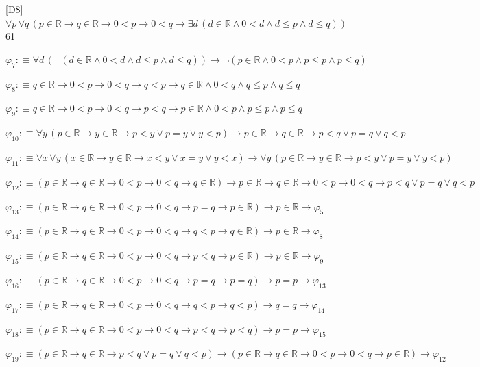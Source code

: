 \begin{fullproof}{[D8]}{$\forall p\,\forall q\,(p \in \mathbb{R} \to q \in \mathbb{R} \to 0 < p \to 0 < q \to \exists d\,(d \in \mathbb{R} \land 0 < d \land d \leq p \land d \leq q))$}{61}
\begin{abbrevlist}
\item $\varphi_{7} :\equiv \forall d\,(\neg (d \in \mathbb{R} \land 0 < d \land d \leq p \land d \leq q)) \to \neg (p \in \mathbb{R} \land 0 < p \land p \leq p \land p \leq q)$
\item $\varphi_{8} :\equiv q \in \mathbb{R} \to 0 < p \to 0 < q \to q < p \to q \in \mathbb{R} \land 0 < q \land q \leq p \land q \leq q$
\item $\varphi_{9} :\equiv q \in \mathbb{R} \to 0 < p \to 0 < q \to p < q \to p \in \mathbb{R} \land 0 < p \land p \leq p \land p \leq q$
\item $\varphi_{10} :\equiv \forall y\,(p \in \mathbb{R} \to y \in \mathbb{R} \to p < y \lor p = y \lor y < p) \to p \in \mathbb{R} \to q \in \mathbb{R} \to p < q \lor p = q \lor q < p$
\item $\varphi_{11} :\equiv \forall x\,\forall y\,(x \in \mathbb{R} \to y \in \mathbb{R} \to x < y \lor x = y \lor y < x) \to \forall y\,(p \in \mathbb{R} \to y \in \mathbb{R} \to p < y \lor p = y \lor y < p)$
\item $\varphi_{12} :\equiv (p \in \mathbb{R} \to q \in \mathbb{R} \to 0 < p \to 0 < q \to q \in \mathbb{R}) \to p \in \mathbb{R} \to q \in \mathbb{R} \to 0 < p \to 0 < q \to p < q \lor p = q \lor q < p$
\item $\varphi_{13} :\equiv (p \in \mathbb{R} \to q \in \mathbb{R} \to 0 < p \to 0 < q \to p = q \to p \in \mathbb{R}) \to p \in \mathbb{R} \to \varphi_{5}$
\item $\varphi_{14} :\equiv (p \in \mathbb{R} \to q \in \mathbb{R} \to 0 < p \to 0 < q \to q < p \to q \in \mathbb{R}) \to p \in \mathbb{R} \to \varphi_{8}$
\item $\varphi_{15} :\equiv (p \in \mathbb{R} \to q \in \mathbb{R} \to 0 < p \to 0 < q \to p < q \to p \in \mathbb{R}) \to p \in \mathbb{R} \to \varphi_{9}$
\item $\varphi_{16} :\equiv (p \in \mathbb{R} \to q \in \mathbb{R} \to 0 < p \to 0 < q \to p = q \to p = q) \to p = p \to \varphi_{13}$
\item $\varphi_{17} :\equiv (p \in \mathbb{R} \to q \in \mathbb{R} \to 0 < p \to 0 < q \to q < p \to q < p) \to q = q \to \varphi_{14}$
\item $\varphi_{18} :\equiv (p \in \mathbb{R} \to q \in \mathbb{R} \to 0 < p \to 0 < q \to p < q \to p < q) \to p = p \to \varphi_{15}$
\item $\varphi_{19} :\equiv (p \in \mathbb{R} \to q \in \mathbb{R} \to p < q \lor p = q \lor q < p) \to (p \in \mathbb{R} \to q \in \mathbb{R} \to 0 < p \to 0 < q \to p \in \mathbb{R}) \to \varphi_{12}$

\end{abbrevlist}
\end{fullproof}
